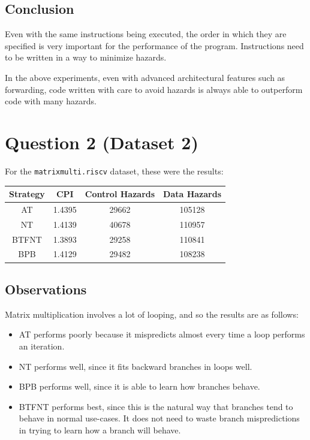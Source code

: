 \documentclass[11pt]{article}
\begin{document}
\subsection{Conclusion}
Even with the same instructions being executed, the order in which they are specified is very important for the performance of the program. Instructions need to be written in a way to minimize hazards.

In the above experiments, even with advanced architectural features such as forwarding, code written with care to avoid hazards is always able to outperform code with many hazards.

\section{Question 2 (Dataset 2)}
For the \texttt{matrixmulti.riscv} dataset, these were the results:
\begin{table}[H]
    \centering
    \begin{tabular}{|c|c|c|c|}
    \hline
    \textbf{Strategy} & \textbf{CPI} & \textbf{Control Hazards} & \textbf{Data Hazards} \\
    \hline
    AT & 1.4395 & 29662 & 105128 \\
    NT & 1.4139 & 40678 & 110957 \\
    BTFNT & 1.3893 & 29258 & 110841 \\
    BPB & 1.4129 & 29482 & 108238 \\
    \hline
    \end{tabular}
    \label{tab:q1values}
\end{table}

\subsection*{Observations}
Matrix multiplication involves a lot of looping, and so the results are as follows:
\begin{itemize}
  \item AT performs poorly because it mispredicts almost every time a loop performs an iteration.
  \item NT performs well, since it fits backward branches in loops well.
  \item BPB performs well, since it is able to learn how branches behave.
  \item BTFNT performs best, since this is the natural way that branches tend to behave in normal use-cases. It does not need to waste branch mispredictions in trying to learn how a branch will behave.
\end{itemize}
\end{document}
